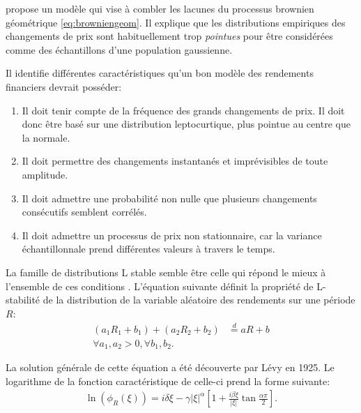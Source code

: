 \cite{mandelbrot1963variation} propose un modèle qui vise à combler
les lacunes du processus brownien géométrique
\eqref{eq:browniengeom}. Il explique que les distributions empiriques
des changements de prix sont habituellement trop \emph{pointues} pour
être considérées comme des échantillons d'une population gaussienne.

Il identifie différentes caractéristiques qu'un bon modèle des
rendements financiers devrait posséder:

\begin{enumerate}
  \label{enum:mandelbrot}
\item Il doit tenir compte de la fréquence des grands changements de
  prix. Il doit donc être basé sur une distribution leptocurtique,
  plus pointue au centre que la normale.
\item Il doit permettre des changements instantanés et imprévisibles
  de toute amplitude.
\item Il doit admettre une probabilité non nulle que plusieurs
  changements consécutifs semblent corrélés.
\item Il doit admettre un processus de prix non stationnaire, car la
  variance échantillonnale prend différentes valeurs à travers le
  temps.
\end{enumerate}

La famille de distributions L stable semble être celle qui répond le
mieux à l'ensemble de ces conditions \citep{walterlevy}. L'équation
suivante définit la propriété de L-stabilité de la distribution de la
variable aléatoire des rendements sur une période $R$:
\begin{align}
  (a_1 R_1 + b_1) + (a_2 R_2 + b_2) &\stackrel{d}{=} aR + b \\
  \forall a_1,a_2 > 0, \forall b_1, b_2.
\end{align}

La solution générale de cette équation a été découverte par Lévy en
1925. Le logarithme de la fonction caractéristique de celle-ci prend
la forme suivante:
\begin{align}
  \ln{(\phi_{R}(\xi))} = i\delta \xi - \gamma |\xi|^{\alpha}
  \left[1+\frac{i\beta \xi}{|\xi|} \tan{\frac{\alpha\pi}{2}} \right].
\end{align}

